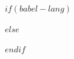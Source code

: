 $if(babel-lang)$
\usepackage[$babel-lang$]{babel}
$else$
\usepackage[spanish,es-noshorthands,es-noindentfirst]{babel}
$endif$
